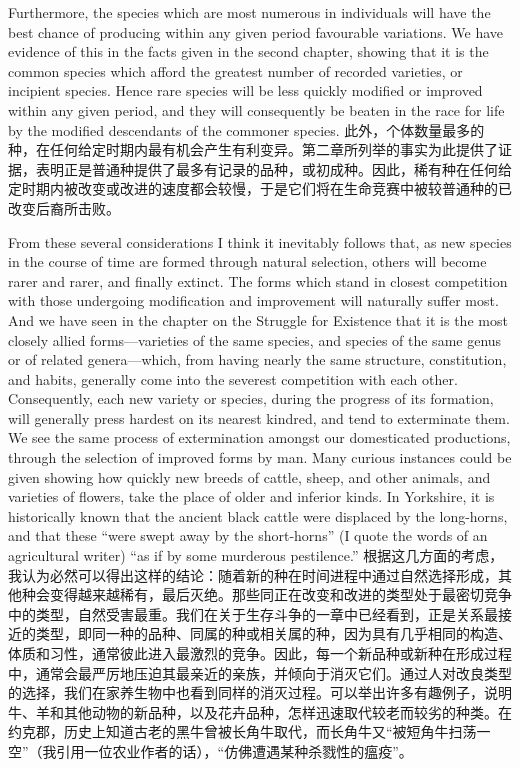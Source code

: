 \darwinpair
{Furthermore, the species which are most numerous in individuals will have the best chance of producing within any given period favourable variations. We have evidence of this in the facts given in the second chapter, showing that it is the common species which afford the greatest number of recorded varieties, or incipient species. Hence rare species will be less quickly modified or improved within any given period, and they will consequently be beaten in the race for life by the modified descendants of the commoner species.}
{此外，个体数量最多的种，在任何给定时期内最有机会产生有利变异。第二章所列举的事实为此提供了证据，表明正是普通种提供了最多有记录的品种，或初成种。因此，稀有种在任何给定时期内被改变或改进的速度都会较慢，于是它们将在生命竞赛中被较普通种的已改变后裔所击败。}

\darwinpair
{From these several considerations I think it inevitably follows that, as new species in the course of time are formed through natural selection, others will become rarer and rarer, and finally extinct. The forms which stand in closest competition with those undergoing modification and improvement will naturally suffer most. And we have seen in the chapter on the Struggle for Existence that it is the most closely allied forms—varieties of the same species, and species of the same genus or of related genera—which, from having nearly the same structure, constitution, and habits, generally come into the severest competition with each other. Consequently, each new variety or species, during the progress of its formation, will generally press hardest on its nearest kindred, and tend to exterminate them. We see the same process of extermination amongst our domesticated productions, through the selection of improved forms by man. Many curious instances could be given showing how quickly new breeds of cattle, sheep, and other animals, and varieties of flowers, take the place of older and inferior kinds. In Yorkshire, it is historically known that the ancient black cattle were displaced by the long-horns, and that these “were swept away by the short-horns” (I quote the words of an agricultural writer) “as if by some murderous pestilence.”}
{根据这几方面的考虑，我认为必然可以得出这样的结论：随着新的种在时间进程中通过自然选择形成，其他种会变得越来越稀有，最后灭绝。那些同正在改变和改进的类型处于最密切竞争中的类型，自然受害最重。我们在关于生存斗争的一章中已经看到，正是关系最接近的类型，即同一种的品种、同属的种或相关属的种，因为具有几乎相同的构造、体质和习性，通常彼此进入最激烈的竞争。因此，每一个新品种或新种在形成过程中，通常会最严厉地压迫其最亲近的亲族，并倾向于消灭它们。通过人对改良类型的选择，我们在家养生物中也看到同样的消灭过程。可以举出许多有趣例子，说明牛、羊和其他动物的新品种，以及花卉品种，怎样迅速取代较老而较劣的种类。在约克郡，历史上知道古老的黑牛曾被长角牛取代，而长角牛又“被短角牛扫荡一空”（我引用一位农业作者的话），“仿佛遭遇某种杀戮性的瘟疫”。}

